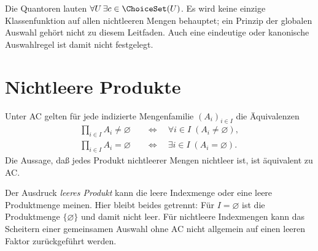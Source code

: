 Die Quantoren lauten $\forall U\,\exists c\in\ChoiceSet(U)$.
Es wird keine einzige Klassenfunktion auf allen nichtleeren Mengen
behauptet; ein Prinzip der globalen Auswahl gehört nicht zu
diesem Leitfaden. Auch eine eindeutige oder kanonische Auswahlregel
ist damit nicht festgelegt.

\section{Nichtleere Produkte}

\begin{theorem}
\label{b09guide:thm:product}
Unter AC gelten für jede indizierte Mengenfamilie $(A_i)_{i\in I}$
die Äquivalenzen
\[
 \begin{aligned}
 \prod_{i\in I}A_i\ne\varnothing
   &\quad\Longleftrightarrow\quad
        \forall i\in I\;(A_i\ne\varnothing),\\
 \prod_{i\in I}A_i=\varnothing
   &\quad\Longleftrightarrow\quad
        \exists i\in I\;(A_i=\varnothing).
 \end{aligned}
\]
Die Aussage, daß jedes Produkt nichtleerer Mengen nichtleer ist,
ist äquivalent zu AC.
\end{theorem}

Der Ausdruck \emph{leeres Produkt} kann die leere Indexmenge oder
eine leere Produktmenge meinen. Hier bleibt beides getrennt:
Für $I=\varnothing$ ist die Produktmenge $\{\varnothing\}$ und
damit nicht leer. Für nichtleere Indexmengen kann das Scheitern
einer gemeinsamen Auswahl ohne AC nicht allgemein auf einen
leeren Faktor zurückgeführt werden.
